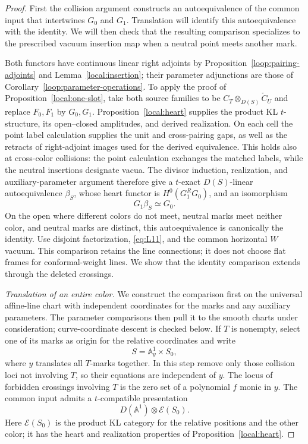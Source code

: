 \documentclass[11pt]{article}
\numberwithin{equation}{section}
\theoremstyle{definition}
\theoremstyle{remark}
\begin{document}
\begin{proof}
First the collision argument constructs an autoequivalence of the
common input that intertwines $G_0$ and $G_1$.  Translation will
identify this autoequivalence with the identity.  We will then check
that the resulting comparison specializes to the prescribed vacuum
insertion map when a neutral point meets another mark.

Both functors have continuous linear right adjoints by
Proposition~\ref{loop:pairing-adjoints} and
Lemma~\ref{local:insertion}; their parameter adjunctions are those of
Corollary~\ref{loop:parameter-operations}.  To apply the proof of
Proposition~\ref{local:one-slot}, take both source families to be
$C_T\otimes_{D(S)}\check C_U$ and replace $F_0,F_1$ by $G_0,G_1$.
Proposition~\ref{local:heart} supplies the product KL $t$-structure,
its open--closed amplitudes, and derived realization.  On each cell
the point label calculation supplies the unit and cross-pairing gaps,
as well as the retracts of right-adjoint images used for the derived
equivalence.  This holds also at cross-color collisions: the point
calculation exchanges the matched labels, while the neutral
insertions designate vacua.  The divisor induction, realization,
and auxiliary-parameter argument therefore give a $t$-exact
$D(S)$-linear autoequivalence $\beta_S$, whose heart functor is
$H^0(G_1^R G_0)$, and an isomorphism
\begin{equation}\label{eq:L13}
                           G_1\beta_S\simeq G_0.
\end{equation}
On the open where different colors do not meet, neutral marks meet
neither color, and neutral marks are distinct, this autoequivalence
is canonically the identity.  Use disjoint factorization,
\eqref{eq:L11}, and the common horizontal $W$ vacuum.  This comparison
retains the line connections; it does not choose flat frames for
conformal-weight lines.  We show that the identity comparison extends
through the deleted crossings.

\smallskip
\noindent\emph{Translation of an entire color.}
We construct the comparison first on the universal affine-line chart
with independent coordinates for the marks and any auxiliary
parameters.  The parameter comparisons then pull it to the smooth
charts under consideration; curve-coordinate descent is checked
below.  If $T$ is nonempty, select one of its marks as origin for
the relative coordinates and write
\[
                           S=\mathbb A^1_y\times S_0,
\]
where $y$ translates all $T$-marks together.  In this step remove
only those collision loci not involving $T$, so their equations
are independent of $y$.  The locus of forbidden crossings involving
$T$ is the zero set of a polynomial $f$ monic in $y$.
The common input admits a $t$-compatible presentation
\[
           D(\mathbb A^1)\otimes\mathcal E(S_0).
\]
Here $\mathcal E(S_0)$ is the product KL category for the relative
positions and the other color; it has the heart and realization
properties of Proposition~\ref{local:heart}.


\end{proof}
\end{document}

